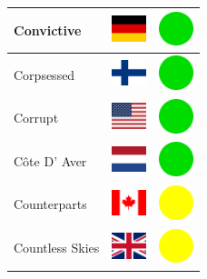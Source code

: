 \documentclass[12pt, a4paper, twoside]{report}
\begin{document}
\begin{center}
\begin{longtable}{|p{5cm}|p{2cm}|p{2cm}|}
 Convictive                                                 & \includegraphics[width=1cm]{../4x3/de} &   \includegraphics[width=1cm]{../likes/y} \\ \hline
 Corpsessed                                                 & \includegraphics[width=1cm]{../4x3/fi} &   \includegraphics[width=1cm]{../likes/y} \\ \hline
 Corrupt                                                    & \includegraphics[width=1cm]{../4x3/us} &   \includegraphics[width=1cm]{../likes/y} \\ \hline
 Côte D' Aver                                               & \includegraphics[width=1cm]{../4x3/nl} &   \includegraphics[width=1cm]{../likes/y} \\ \hline
 Counterparts                                               & \includegraphics[width=1cm]{../4x3/ca} &   \includegraphics[width=1cm]{../likes/m} \\ \hline
 Countless Skies                                            & \includegraphics[width=1cm]{../4x3/gb} &   \includegraphics[width=1cm]{../likes/m} \\ \hline

\end{longtable}
\end{center}
\end{document}
